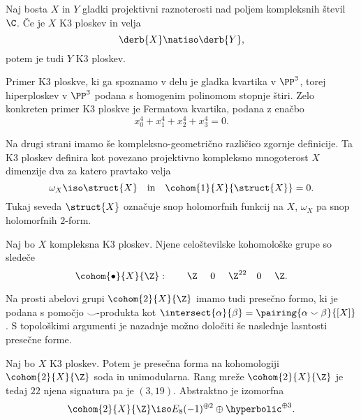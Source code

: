 \begin{izrek}
    Naj bosta $X$ in $Y$ gladki projektivni raznoterosti nad poljem kompleksnih števil $\C$. Če je $X$ K3 ploskev in velja
    \[
        \derb{X} \natiso \derb{Y},
    \]
    potem je tudi $Y$ K3 ploskev. 
\end{izrek}

Primer K3 ploskve, ki ga spoznamo v delu je gladka kvartika v $\PP^3$, torej hiperploskev v $\PP^3$ podana s homogenim polinomom stopnje štiri. Zelo konkreten primer K3 ploskve je Fermatova kvartika, podana z enačbo
\[
    x_0^4 + x_1^4 + x_2^4 + x_3^4 = 0.
\]




Na drugi strani imamo še kompleksno-geometrično različico zgornje definicije. Ta K3 ploskev definira kot povezano projektivno kompleksno mnogoterost $X$ dimenzije dva za katero pravtako velja
\[
    \omega_X \iso \struct{X} \quad \text{in} \quad \cohom{1}{X}{\struct{X}} = 0.
\]
Tukaj seveda $\struct{X}$ označuje snop holomorfnih funkcij na $X$, $\omega_X$ pa snop holomorfnih $2$-form.

\begin{trditev}
    Naj bo $X$ kompleksna K3 ploskev. Njene celoštevilske kohomološke grupe so sledeče
    \begin{equation}
        \cohom{\bullet}{X}{\Z}: \qquad \Z \ \quad 0\ \quad \Z^{22} \quad 0\ \quad \Z.
    \end{equation}
\end{trditev}

Na prosti abelovi grupi $\cohom{2}{X}{\Z}$ imamo tudi presečno formo, ki je podana s pomočjo $\smallsmile$-produkta kot $\intersect{\alpha}{\beta} = \pairing{\alpha \smallsmile \beta}{[X]}$. S topološkimi argumenti je nazadnje možno določiti še naslednje lasntosti presečne forme.

\begin{trditev}
    Naj bo $X$ K3 ploskev. Potem je presečna forma na kohomologiji $\cohom{2}{X}{\Z}$ soda in unimodularna. Rang mreže $\cohom{2}{X}{\Z}$ je tedaj $22$ njena signatura pa je $(3,19)$. Abstraktno je izomorfna
    \begin{equation}
        \cohom{2}{X}{\Z} \iso E_8(-1)^{\oplus 2} \oplus \hyperbolic^{\oplus 3}.
    \end{equation}
\end{trditev}

